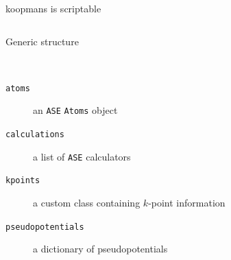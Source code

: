 \documentclass[xcolor=table,aspectratio=169]{beamer}
\numberwithin{equation}{section}
\begin{document}

\begin{frame}{koopmans is scriptable}
   \vspace{-2ex}
   \inputminted[fontsize=\scriptsize,breaklines]{python}{scripts/si.py}
\end{frame}

\begin{frame}{Generic structure}

   \begin{description}[<+->]
      \item[\texttt{Workflow}] \vphantom{x}\\
    \begin{description}
       \item[\texttt{atoms}] an \texttt{ASE} \texttt{Atoms} object
       \item[\texttt{calculations}] a list of \texttt{ASE} calculators 
       \item[\texttt{kpoints}] a custom class containing $k$-point information
       \item[\texttt{pseudopotentials}] a dictionary of pseudopotentials
    \end{description}
   \end{description}

   
\end{frame}
\end{document}
